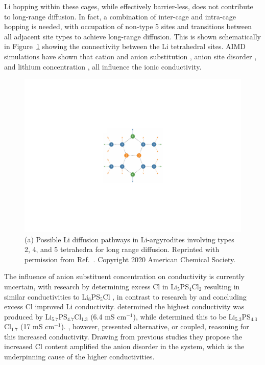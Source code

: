 \documentclass[../main.tex]{subfiles}
\begin{document}
Li hopping within these cages, while effectively barrier-less, does not contribute to long-range diffusion. In fact, a combination of inter-cage and intra-cage hopping is needed, with occupation of non-type 5 sites and transitions between all adjacent site types to achieve long-range diffusion. This is shown schematically in Figure~\ref{fig:diffusion_pathways} showing the connectivity between the Li tetrahedral sites. AIMD simulations have shown that cation and anion substitution \cite{ohno2019further,deklerk2016}, anion site disorder \cite{gautamengineering,morgan2020mechanistic}, and lithium concentration \cite{Deng2017, yu_superionic_2020, Feng_2020}, all influence the ionic conductivity.

\begin{figure}
    \centering
    \includegraphics[scale=0.65]{figures/diffusion_pathways.pdf}
    \caption{(a) Possible Li diffusion pathways in Li-argyrodites involving types 2, 4, and 5 tetrahedra for long range diffusion. Reprinted with permission from Ref.~. Copyright 2020 American Chemical Society.}
    \label{fig:diffusion_pathways}
\end{figure}

The influence of anion substituent concentration on conductivity is currently uncertain, with research by \citeauthor{deklerk2016} determining excess Cl in Li$_5$PS$_4$Cl$_2$ resulting in similar conductivities to Li$_6$PS$_5$Cl \cite{deklerk2016}, in contrast to research by \citeauthor{yu2019tailoring} and \citeauthor{Feng_2020} concluding excess Cl improved Li conductivity. \citeauthor{yu2019tailoring} determined the highest conductivity was produced by Li$_{5.7}$PS$_{4.7}$Cl$_{1.3}$ (6.4 mS cm$^{-1}$), \cite{yu2019tailoring,yu_superionic_2020} while \citeauthor{Feng_2020} determined this to be Li$_{5.3}$PS$_{4.3}$Cl$_{1.7}$ (17 mS cm$^{-1}$). \cite{Feng_2020} \citeauthor{Feng_2020}, however, presented alternative, or coupled, reasoning for this increased conductivity. Drawing from previous studies \cite{adeli2019,zhou_solvent-engineered_2019} they propose the increased Cl content amplified the anion disorder in the system, which is the underpinning cause of the higher conductivities.
\end{document}
